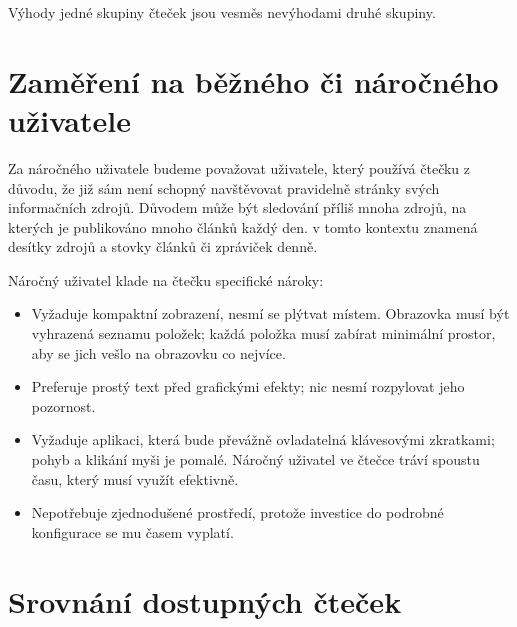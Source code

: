 Výhody jedné skupiny čteček jsou vesměs nevýhodami druhé skupiny.

\section{Zaměření na běžného či náročného uživatele}

Za náročného uživatele budeme považovat uživatele, který používá čtečku z důvodu, že již sám není schopný navštěvovat pravidelně stránky svých informačních zdrojů.
Důvodem může být sledování příliš mnoha zdrojů, na kterých je publikováno mnoho článků každý den.
 v tomto kontextu znamená desítky zdrojů a stovky článků či zpráviček denně.

Náročný uživatel klade na čtečku specifické nároky:
\begin{itemize}
    \item Vyžaduje kompaktní zobrazení, nesmí se plýtvat místem.
        Obrazovka musí být vyhrazená seznamu položek; každá položka musí zabírat minimální prostor, aby se jich vešlo na obrazovku co nejvíce.
    \item Preferuje prostý text před grafickými efekty; nic nesmí rozpylovat jeho pozornost.
    \item Vyžaduje aplikaci, která bude převážně ovladatelná klávesovými zkratkami; pohyb a klikání myši je pomalé.
        Náročný uživatel ve čtečce tráví spoustu času, který musí využít efektivně.
    \item Nepotřebuje zjednodušené prostředí, protože investice do podrobné konfigurace se mu časem vyplatí.
\end{itemize}

\section{Srovnání dostupných čteček}


